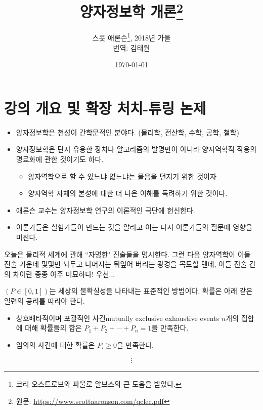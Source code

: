 \documentclass[a4paper,chapter,kosection,atbegshi,hidelinks,itemph]{oblivoir}
\begin{document}
\title{양자정보학 개론\thanks{원문: \url{https://www.scottaaronson.com/qclec.pdf}}}
\author{
    스콧 애론슨\thanks{코리 오스트로브와 파울로 알브스의 큰 도움을 받았다.}, 
    2018년 가을\\
    번역: 김태원
}
\date{\today}
\newpage
\maketitle\thispagestyle{empty}\newpage

\tableofcontents\pagestyle{plain}

\chapter{강의 개요 및 확장 처치-튜링 논제}
\begin{itemize}[label=\(\blacktriangleright\)]
    \item 양자정보학은 천성이 간학문적인 분야다. (물리학, 전산학, 수학, 공학, 철학)
    \item 양자정보학은 단지 유용한 장치나 알고리즘의 발명만이 아니라 양자역학적 작용의 명료화에 관한 것이기도 하다.
    \begin{itemize}
        \item 양자역학으로 할 수 있느냐 없느냐는 물음을 던지기 위한 것이자
        \item 양자역학 자체의 본성에 대한 더 나은 이해를 독려하기 위한 것이다.
    \end{itemize}
    \item 애론슨 교수는 양자정보학 연구의 이론적인 극단에 헌신한다.
    \item 이론가들은 실험가들이 만드는 것을 알리고 이는 다시 이론가들의 질문에 영향을 미친다.
\end{itemize}\hfill\break
오늘은 물리적 세계에 관해 ``자명한" 진술들을 명시한다.
그런 다음 양자역학이 이들 진술 가운데 몇몇만 놔두고 나머지는 뒤엎어 버리는 광경을
목도할 텐데, 이들 진술 간의 차이란 종종 아주 미묘하다!
우선...\hfill\break

\begin{description}[leftmargin=0cm]
    \item[\textbf{확률}\;] 
        $(P\in[0,1])$는 세상의 불확실성을 나타내는 표준적인 방법이다. 
        확률은 아래 같은 일련의 공리를 따라야 한다.
        \begin{itemize}[label=$\blacktriangleright$]
            \item  상호배타적이며 포괄적인 사건{\footnotesize mutually exclusive
            exhaustive events} $n$개의 집합에 대해  
                확률들의 합은 $P_1+P_2+\cdots+P_n=1$을 만족한다.
            \item 임의의 사건에 대한 확률은 $P_i\geq0$을 만족한다.
        \end{itemize}
        \begin{align*}\pmb{\vdots}\end{align*}
\end{description}
\end{document}
